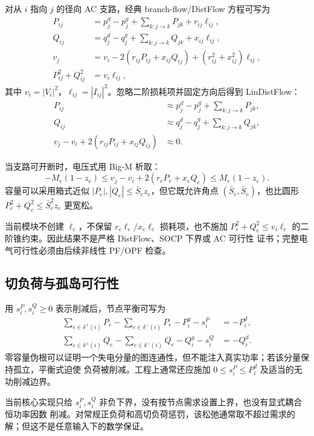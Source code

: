 对从 $i$ 指向 $j$ 的径向 AC 支路，经典 branch-flow/DistFlow 方程可写为
\begin{align}
P_{ij}&=p_j^d-p_j^g+\sum_{k:j\to k}P_{jk}+r_{ij}\ell_{ij},\\
Q_{ij}&=q_j^d-q_j^g+\sum_{k:j\to k}Q_{jk}+x_{ij}\ell_{ij},\\
v_j&=v_i-2(r_{ij}P_{ij}+x_{ij}Q_{ij})+(r_{ij}^2+x_{ij}^2)\ell_{ij},\\
P_{ij}^2+Q_{ij}^2&=v_i\ell_{ij},
\end{align}
其中 $v_i=|V_i|^2$，$\ell_{ij}=|I_{ij}|^2$。忽略二阶损耗项并固定方向后得到
LinDistFlow：
\begin{align}
P_{ij}&\approx p_j^d-p_j^g+\sum_{k:j\to k}P_{jk},\\
Q_{ij}&\approx q_j^d-q_j^g+\sum_{k:j\to k}Q_{jk},\\
v_j-v_i+2(r_{ij}P_{ij}+x_{ij}Q_{ij})&\approx0.
\end{align}

当支路可开断时，电压式用 Big-M 析取：
\begin{equation}
-M_e(1-z_e)\le v_j-v_i+2(r_eP_e+x_eQ_e)\le M_e(1-z_e).
\end{equation}
容量可以采用箱式近似 $|P_e|,|Q_e|\le\bar S_ez_e$，但它既允许角点
$(\bar S_e,\bar S_e)$，也比圆形 $P_e^2+Q_e^2\le\bar S_e^2z_e$ 更宽松。

\begin{gapnote}
当前模块不创建 $\ell_e$，不保留 $r_e\ell_e/x_e\ell_e$ 损耗项，也不施加
$P_e^2+Q_e^2\le v_i\ell_e$ 的二阶锥约束。因此结果不是严格 DistFlow、SOCP 下界或 AC 可行性
证书；完整电气可行性必须由后续非线性 PF/OPF 检查。
\end{gapnote}

\subsection{切负荷与孤岛可行性}

用 $s_i^P,s_i^Q\ge0$ 表示削减后，节点平衡可写为
\begin{align}
\sum_{e\in\delta^+(i)}P_e-\sum_{e\in\delta^-(i)}P_e-P_i^g-s_i^P&=-P_i^d,\\
\sum_{e\in\delta^+(i)}Q_e-\sum_{e\in\delta^-(i)}Q_e-Q_i^g-s_i^Q&=-Q_i^d.
\end{align}
零容量伪根可以证明一个失电分量的图连通性，但不能注入真实功率；若该分量保持孤立，平衡式迫使
负荷被削减。工程上通常还应施加 $0\le s_i^P\le P_i^d$ 及适当的无功削减边界。

\begin{gapnote}
当前核心实现只给 $s_i^P,s_i^Q$ 非负下界，没有按节点需求设置上界，也没有显式耦合恒功率因数
削减。对常规正负荷和高切负荷惩罚，该松弛通常取不超过需求的解；但这不是任意输入下的数学保证。
\end{gapnote}

